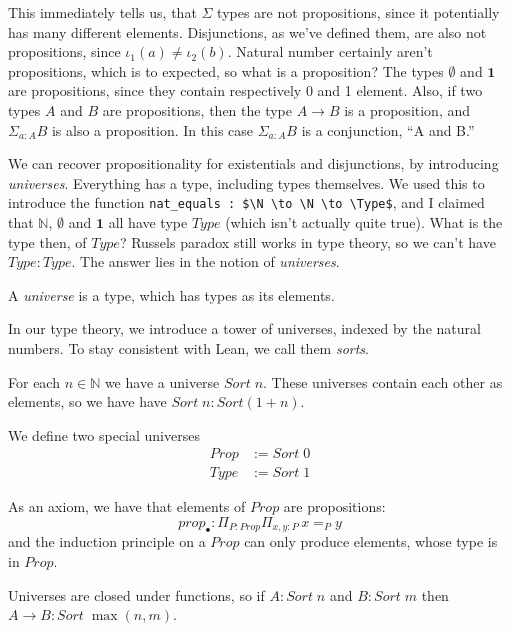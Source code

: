 \documentclass[a4paper, 12pt]{article}
\newcommand{\N}{\mathbb{N}}
\newcommand{\Prop}{\mathit{Prop}}
\newcommand{\Type}{\mathit{Type}}
\newcommand{\Sort}{\mathit{Sort\;}}
\renewcommand{\Prop}{\mathit{Prop}}
\theoremstyle{changedot}
\theoremstyle{changedotbreak}
\theoremstyle{nonumberplain}
\begin{document}
This immediately tells us, that $\Sigma$ types are not propositions, since it potentially has many different elements. Disjunctions, as we've defined them, are also not propositions, since $\iota_{1}(a) \neq \iota_{2}(b)$. Natural number certainly aren't propositions, which is to expected, so what is a proposition? The types $\emptyset$ and $\mathbf 1$ are propositions, since they contain respectively 0 and 1 element. Also, if two types $A$ and $B$ are propositions, then the type $A \to B$ is a proposition, and $\Sigma_{a:A}B$ is also a proposition. In this case $\Sigma_{a:A}B$ is a conjunction, ``A and B.''

We can recover propositionality for existentials and disjunctions, by introducing \textit{universes}. Everything has a type, including types themselves. We used this to introduce the function \lstinline{nat_equals : $\N \to \N \to \Type$}, and I claimed that $\N$, $\emptyset$ and $\mathbf 1$ all have type $\Type$ (which isn't actually quite true). What is the type then, of $\Type$? Russels paradox still works in type theory, so we can't have $\Type : \Type$. The answer lies in the notion of \textit{universes}.

\begin{definition}
  A \textit{universe} is a type, which has types as its elements.
\end{definition}

In our type theory, we introduce a tower of universes, indexed by the natural numbers. To stay consistent with Lean, we call them \textit{sorts}.

\begin{definition}
  For each $n \in \N$ we have a universe $\Sort n$. These universes contain each other as elements, so we have have $\Sort n : Sort(1+n)$.

  We define two special universes
  \begin{align*}
    \Prop &:= \Sort 0\\
    \Type &:= \Sort 1
  \end{align*}

  As an axiom, we have that elements of $\Prop$ are propositions:
  \[prop_{\bullet} : \Pi_{P:\Prop}\Pi_{x, y:P}\, x=_{P}y\]
  and the induction principle on a $\Prop$ can only produce elements, whose type is in $\Prop$.

  Universes are closed under functions, so if $A : \Sort n$ and $B : \Sort m$ then $A \to B : \Sort \max(n, m)$.
\end{definition}
\end{document}

